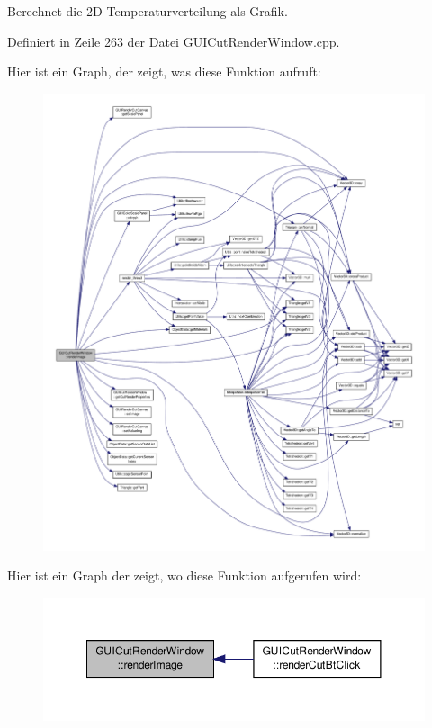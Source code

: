 Berechnet die 2\-D-\/\-Temperaturverteilung als Grafik. 



Definiert in Zeile 263 der Datei G\-U\-I\-Cut\-Render\-Window.\-cpp.



Hier ist ein Graph, der zeigt, was diese Funktion aufruft\-:\nopagebreak
\begin{figure}[H]
\begin{center}
\leavevmode
\includegraphics[width=350pt]{classGUICutRenderWindow_a9eedb7088ad31f4680a77ed3a06fa60c_cgraph}
\end{center}
\end{figure}




Hier ist ein Graph der zeigt, wo diese Funktion aufgerufen wird\-:\nopagebreak
\begin{figure}[H]
\begin{center}
\leavevmode
\includegraphics[width=350pt]{classGUICutRenderWindow_a9eedb7088ad31f4680a77ed3a06fa60c_icgraph}
\end{center}
\end{figure}




